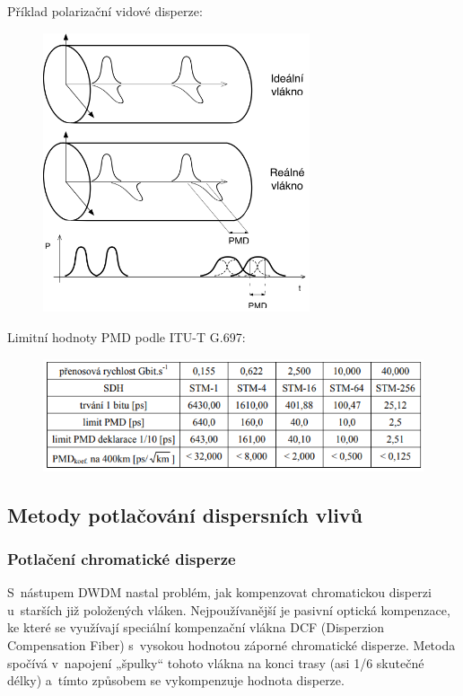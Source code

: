 Příklad polarizační vidové disperze:
\begin{figure}[!ht]
  \begin{center}
    \includegraphics[width=0.70\textwidth]{obrazky/polardisp.png}
  \end{center}
\end{figure}

Limitní hodnoty PMD podle ITU-T G.697:
\begin{figure}[!ht]
  \begin{center}
    \includegraphics[scale=1]{obrazky/ITUpolar.png}
  \end{center}
\end{figure}

\subsection{Metody potlačování dispersních vlivů}
\subsubsection{Potlačení chromatické disperze}
S~nástupem DWDM nastal problém, jak kompenzovat chromatickou disperzi u~starších již položených vláken. Nejpoužívanější je pasivní optická kompenzace, ke které se využívají speciální kompenzační vlákna DCF (Disperzion Compensation Fiber) s~vysokou hodnotou záporné chromatické disperze. Metoda spočívá v~napojení „špulky“ tohoto vlákna na konci trasy (asi 1/6 skutečné délky) a~tímto způsobem se vykompenzuje hodnota disperze.

